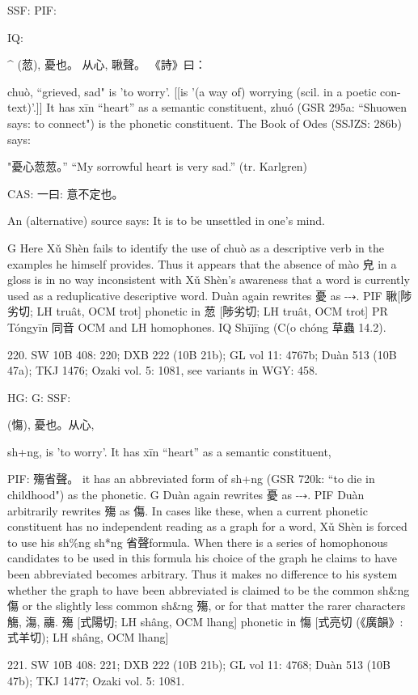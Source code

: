 {SSF: PIF:

IQ:

^ (䓤),
憂也。
从心, 䎿聲。
《詩》曰：


chuò, ``grieved, sad"
is 'to worry'. [[is '(a way of) worrying (scil. in a poetic con- text)'.]]
It has xīn ``heart'' as a semantic constituent,
zhuó (GSR 295a: ``Shuowen says: to connect") is the phonetic constituent.
The Book of Odes (SSJZS: 286b) says:

"憂心䓤䓤。'' ``My sorrowful heart is very sad.'' (tr. Karlgren)

CAS: 一曰:
意不定也。

An (alternative) source says:
It is to be unsettled in one's mind.

G Here Xǔ Shèn fails to identify the use of chuò as a descriptive verb in the examples he himself provides. Thus it appears that the absence of mào 皃 in a gloss is in no way inconsistent with Xǔ Shèn's awareness that a word is currently used as a reduplicative descriptive word.
Duàn again rewrites 憂 as ⤏.
PIF     䎿[陟劣切; LH truât, OCM trot] phonetic in 䓤 [陟劣切; LH truât, OCM trot]
PR	Tóngyīn 同音 OCM and LH homophones.
IQ	Shījīng (C(o chóng 草蟲 14.2).

220. SW 10B 408: 220; DXB 222 (10B 21b); GL vol 11: 4767b; Duàn 513 (10B 47a); TKJ 1476; Ozaki vol. 5: 1081, see
variants in WGY: 458.


HG:
G: SSF:

(慯),
憂也。从心,


sh+ng,
is 'to worry'.
It has xīn ``heart'' as a semantic constituent,



PIF: 殤省聲。 it has an abbreviated form of sh+ng (GSR 720k: ``to die in childhood") as the phonetic.
G    Duàn again rewrites 憂 as ⤏.
PIF Duàn arbitrarily rewrites 殤 as 傷. In cases like these, when a current phonetic constituent has no independent reading as a graph for a word, Xǔ Shèn is forced to use his sh\%ng sh*ng 省聲formula. When there is a series of homophonous candidates to be used in this formula his choice of the graph he claims to have been abbreviated becomes arbitrary. Thus it makes no difference to his system whether the graph to have been abbreviated is claimed to be the common sh&ng 傷 or the slightly less common sh&ng 殤, or for that matter the rarer characters 觴, 漡, 鬺.
殤 [式陽切; LH shâng, OCM lhang] phonetic in 慯 [式亮切 (《廣韻》: 式羊切); LH shâng,
OCM lhang]


221. SW 10B 408: 221; DXB 222 (10B 21b); GL vol 11: 4768; Duàn 513 (10B 47b); TKJ 1477; Ozaki vol. 5: 1081.

}
